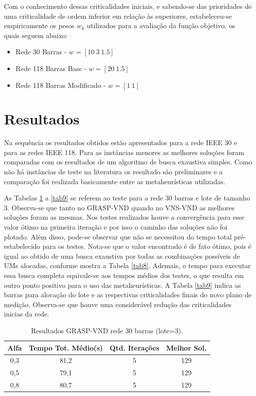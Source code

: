 \documentclass[12pt]{article}
\begin{document}
Com o conhecimento dessas criticalidades iniciais, e sabendo-se das prioridades de uma criticalidade de ordem inferior em relação às superiores, estabeleceu-se empiricamente os pesos $w_k$ utilizados para a avaliação da função objetivo, os quais seguem abaixo:
\begin{itemize}
	\item Rede 30 Barras - $w=[10~3~1.5]$ 
	\item Rede 118 Barras Base - $w=[20~1.5]$ 
	\item Rede 118 Barras Modificado - $w=[1~1]$ 
\end{itemize}

\section{Resultados}

Na sequência os resultados obtidos estão apresentados para a rede IEEE 30 e para as redes IEEE 118. Para as instâncias menores as melhores soluções foram comparadas com os resultados de um algoritmo de busca exaustiva simples. Como não há instâncias de teste na literatura os resultado são preliminares e a comparação foi realizada basicamente entre as metaheurísticas utilizadas.

As Tabelas \ref{tab6} a \ref{tab9} se referem ao teste para a rede 30 barras e lote de tamanho 3. Observa-se que tanto no GRASP-VND quando no VNS-VND as melhores soluções foram as mesmas. Nos testes realizados houve a convergência para esse valor ótimo na primeira iteração e por isso o caminho das soluções não foi plotado. Além disso, pode-se observar que não se necessitou do tempo total pré-estabelecido para os testes. Nota-se que o valor encontrado é de fato ótimo, pois é igual ao obtido de uma busca exaustiva por todas as combinações possíveis de UMs alocadas, conforme mostra a Tabela \ref{tab8}. Ademais, o tempo para executar essa busca completa equivale-se aos tempos médios dos testes, o que resulta em outro ponto positivo para o uso das metaheurísticas. A Tabela \ref{tab9} indica as barras para alocação do lote e as respectivas criticalidades finais do novo plano de medição. Observa-se que houve uma considerável redução das criticalidades inicias da rede.

\begin{table}[H]
	\centering
	\caption{Resultados GRASP-VND rede 30 barras (lote=3).}
	\begin{tabular}{|c|c|c|c|}
		\hline
		\textbf{Alfa} & \textbf{Tempo Tot. Médio(s)} & \textbf{Qtd. Iterações} & \textbf{Melhor Sol.} \\
		\hline
		0,3   & 81,2  & 5     & 129 \\
		\hline
		0,5   & 79,1  & 5     & 129 \\
		\hline
		0,8   & 80,7  & 5     & 129 \\
		\hline
	\end{tabular}%
	\label{tab6}%
\end{table}%
\end{document}
